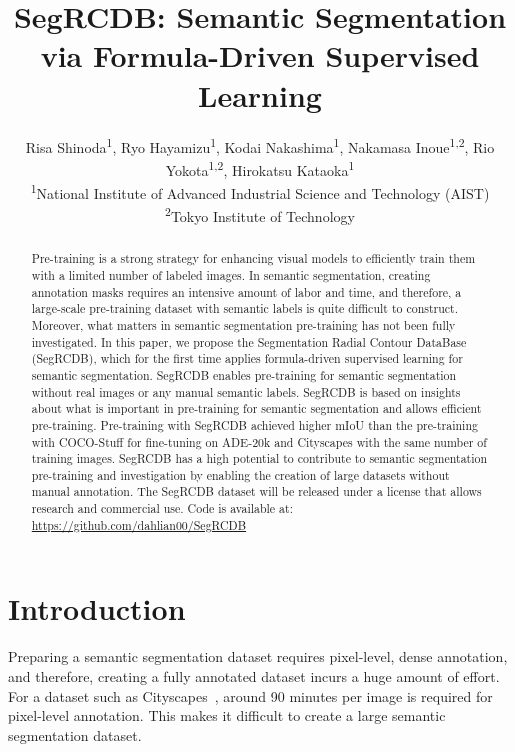 \documentclass[10pt,twocolumn,letterpaper]{article}
\begin{document}
\title{SegRCDB: Semantic Segmentation via Formula-Driven Supervised Learning}

\author{Risa Shinoda\textsuperscript{\rm 1},
Ryo Hayamizu\textsuperscript{\rm 1},
Kodai Nakashima\textsuperscript{\rm 1},
Nakamasa Inoue\textsuperscript{\rm 1,2},
Rio Yokota\textsuperscript{\rm 1,2},
Hirokatsu Kataoka\textsuperscript{\rm 1}\\
\textsuperscript{\rm 1}National Institute of Advanced Industrial Science and Technology (AIST)\\
\textsuperscript{\rm 2}Tokyo Institute of Technology}

\maketitle
\ificcvfinal\thispagestyle{empty}\fi

\begin{abstract}
Pre-training is a strong strategy for enhancing visual models to efficiently train them with a limited number of labeled images. In semantic segmentation, creating annotation masks requires an intensive amount of labor and time, and therefore, a large-scale pre-training dataset with semantic labels is quite difficult to construct. Moreover, what matters in semantic segmentation pre-training has not been fully investigated.
In this paper, we propose the Segmentation Radial Contour DataBase (SegRCDB), which for the first time applies formula-driven supervised learning for semantic segmentation. SegRCDB enables pre-training for semantic segmentation without real images or any manual semantic labels.
SegRCDB is based on insights about what is important in pre-training for semantic segmentation and allows efficient pre-training.
Pre-training with SegRCDB achieved higher mIoU than the pre-training with COCO-Stuff for fine-tuning on ADE-20k and Cityscapes with the same number of training images.
SegRCDB has a high potential to contribute to semantic segmentation pre-training and investigation by enabling the creation of large datasets without manual annotation. The SegRCDB dataset will be released under a license that allows research and commercial use. Code is available at: \url{https://github.com/dahlian00/SegRCDB}
\end{abstract}

\section{Introduction}
\label{sec:intro}
Preparing a semantic segmentation dataset requires pixel-level, dense annotation, and therefore, creating a fully annotated dataset incurs a huge amount of effort. 
For a dataset such as Cityscapes~\cite{Cordts2016Cityscapes}, around 90 minutes per image is required for pixel-level annotation.
This makes it difficult to create a large semantic segmentation dataset.
\end{document}
